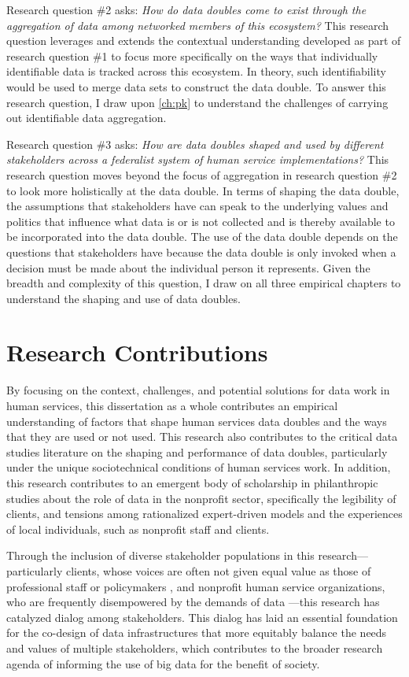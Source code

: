 Research question \#2 asks: \emph{How do data doubles come to exist through the aggregation of data among networked members of this ecosystem?} This research question leverages and extends the contextual understanding developed as part of research question \#1 to focus more specifically on the ways that individually identifiable data is tracked across this ecosystem. In theory, such identifiability would be used to merge data sets to construct the data double. To answer this research question, I draw upon \autoref{ch:pk} to understand the challenges of carrying out identifiable data aggregation.

Research question \#3 asks: \emph{How are data doubles shaped and used by different stakeholders across a federalist system of human service implementations?} This research question moves beyond the focus of aggregation in research question \#2 to look more holistically at the data double. In terms of shaping the data double, the assumptions that stakeholders have can speak to the underlying values and politics that influence what data is or is not collected and is thereby available to be incorporated into the data double. The use of the data double depends on the questions that stakeholders have because the data double is only invoked when a decision must be made about the individual person it represents. Given the breadth and complexity of this question, I draw on all three empirical chapters to understand the shaping and use of data doubles.

\section{Research Contributions}
By focusing on the context, challenges, and potential solutions for data work in human services, this dissertation as a whole contributes an empirical understanding of factors that shape human services data doubles and the ways that they are used or not used. This research also contributes to the critical data studies literature on the shaping and performance of data doubles, particularly under the unique sociotechnical conditions of human services work. In addition, this research contributes to an emergent body of scholarship in philanthropic studies about the role of data in the nonprofit sector, specifically the legibility of clients, and tensions among rationalized expert-driven models and the experiences of local individuals, such as nonprofit staff and clients.

Through the inclusion of diverse stakeholder populations in this research---particularly clients, whose voices are often not given equal value as those of professional staff or policymakers \citep{Bopp2019Voices}, and nonprofit human service organizations, who are frequently disempowered by the demands of data \citep{Bopp2017DbD}---this research has catalyzed dialog among stakeholders. This dialog has laid an essential foundation for the co-design of data infrastructures that more equitably balance the needs and values of multiple stakeholders, which contributes to the broader research agenda of informing the use of big data for the benefit of society.